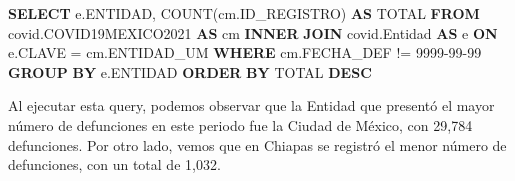 \documentclass[11pt]{article}
\newenvironment{Shaded}{}{}
\newcommand{\KeywordTok}[1]{\textcolor[rgb]{0.00,0.44,0.13}{\textbf{{#1}}}}
\newcommand{\StringTok}[1]{\textcolor[rgb]{0.25,0.44,0.63}{{#1}}}
\newcommand{\FunctionTok}[1]{\textcolor[rgb]{0.02,0.16,0.49}{{#1}}}
\newcommand{\NormalTok}[1]{{#1}}
\newcommand{\OperatorTok}[1]{\textcolor[rgb]{0.40,0.40,0.40}{{#1}}}
\begin{document}
\begin{Shaded}
\begin{Highlighting}[]
\KeywordTok{SELECT} 
\NormalTok{    e.ENTIDAD,}
    \FunctionTok{COUNT}\NormalTok{(cm.ID\_REGISTRO) }\KeywordTok{AS}\NormalTok{ TOTAL}
\KeywordTok{FROM} 
\NormalTok{    covid.COVID19MEXICO2021 }\KeywordTok{AS}\NormalTok{ cm }
\KeywordTok{INNER} \KeywordTok{JOIN}
\NormalTok{    covid.Entidad }\KeywordTok{AS}\NormalTok{ e }\KeywordTok{ON}\NormalTok{ e.CLAVE }\OperatorTok{=}\NormalTok{ cm.ENTIDAD\_UM }
\KeywordTok{WHERE} 
\NormalTok{    cm.FECHA\_DEF }\OperatorTok{!=} \StringTok{\textquotesingle{}9999{-}99{-}99\textquotesingle{}}
\KeywordTok{GROUP} \KeywordTok{BY}
\NormalTok{    e.ENTIDAD}
\KeywordTok{ORDER} \KeywordTok{BY}
\NormalTok{    TOTAL }\KeywordTok{DESC}
\end{Highlighting}
\end{Shaded}

Al ejecutar esta query, podemos observar que la Entidad que presentó el
mayor número de defunciones en este periodo fue la Ciudad de México, con
29,784 defunciones. Por otro lado, vemos que en Chiapas se registró el
menor número de defunciones, con un total de 1,032.
\end{document}
